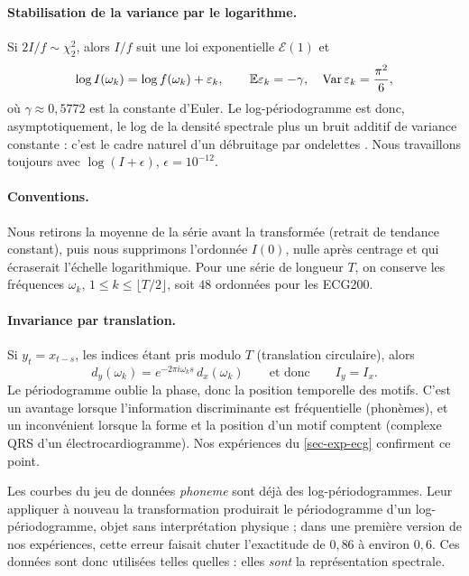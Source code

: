 \paragraph{Stabilisation de la variance par le logarithme.} Si $2I/f\sim\chi^2_2$, alors $I/f$ suit une loi exponentielle $\mathcal E(1)$ et
\[
  \log I(\omega_k)=\log f(\omega_k)+\varepsilon_k,
  \qquad \mathbb{E}\varepsilon_k=-\gamma,\quad \operatorname{Var}\varepsilon_k=\frac{\pi^2}{6},
\]
où $\gamma\approx0{,}5772$ est la constante d'Euler. Le log-périodogramme est donc, asymptotiquement, le log de la densité spectrale plus un bruit additif de variance constante : c'est le cadre naturel d'un débruitage par ondelettes \citep{wahba1980automatic,moulin1994wavelet}. Nous travaillons toujours avec $\log(I+\epsilon)$, $\epsilon=10^{-12}$.

\paragraph{Conventions.} Nous retirons la moyenne de la série avant la transformée (retrait de tendance constant), puis nous supprimons l'ordonnée $I(0)$, nulle après centrage et qui écraserait l'échelle logarithmique. Pour une série de longueur $T$, on conserve les fréquences $\omega_k$, $1\le k\le\lfloor T/2\rfloor$, soit $48$ ordonnées pour les ECG200.

\paragraph{Invariance par translation.} Si $y_t=x_{t-s}$, les indices étant pris modulo $T$ (translation circulaire), alors
\[
  d_y(\omega_k)=e^{-2\pi i\omega_ks}\,d_x(\omega_k)\qquad\text{et donc}\qquad I_y=I_x .
\] Le périodogramme oublie la phase, donc la position temporelle des motifs. C'est un avantage lorsque l'information discriminante est fréquentielle (phonèmes), et un inconvénient lorsque la forme et la position d'un motif comptent (complexe QRS d'un électrocardiogramme). Nos expériences du \cref{sec-exp-ecg} confirment ce point.

\begin{remarque}\label{rem-phoneme-spectral}
Les courbes du jeu de données \emph{phoneme} sont déjà des log-périodogrammes. Leur appliquer à nouveau la transformation produirait le périodogramme d'un log-périodogramme, objet sans interprétation physique ; dans une première version de nos expériences, cette erreur faisait chuter l'exactitude de $0{,}86$ à environ $0{,}6$. Ces données sont donc utilisées telles quelles : elles \emph{sont} la représentation spectrale.
\end{remarque}
